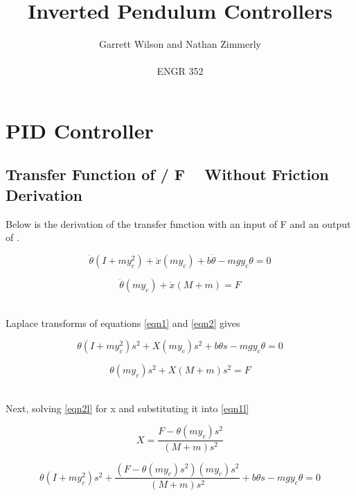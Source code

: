 \documentclass{article}
\begin{document}
\title{Inverted Pendulum Controllers}
\author{Garrett Wilson and Nathan Zimmerly \\ \\
ENGR 352}
\maketitle

\clearpage

\tableofcontents

\pagebreak

\section{PID Controller}
\subsection{Transfer Function of \theta / F \ \textrm{ Without Friction Derivation}}
Below is the derivation of the transfer function with an input of F and an output of \theta.


\begin{equation} 
\label{eqn1}
\ddot \theta (I+m y_c^2)+\ddot x (m y_c)+b \dot \theta - m g y_c \theta = 0 
\end{equation}


\begin{equation} 
\label{eqn2}
\ddot \theta(m y_c) + \ddot x(M+m) = F
\end{equation}

\\
Laplace transforms of equations \ref{eqn1} and \ref{eqn2} gives


\begin{equation} 
\label{eqn1l}
\theta (I+m y_c^2) s^2+ X (m y_c) s^2+b \theta s - m g y_c \theta = 0 
\end{equation}


\begin{equation}  
\label{eqn2l}
\theta (m y_c) s^2+ X (M+m) s^2= F
\end{equation}

\\
Next, solving \ref{eqn2l} for x and substituting it into \ref{eqn1l}

\begin{equation}  
\label{eqn2lb}
X = \frac{F - \theta (m y_c) s^2}{(M+m) s^2}
\end{equation}

\begin{equation} 
\label{eqn3}
\theta (I+m y_c^2) s^2+ \frac{(F - \theta (m y_c) s^2)(m y_c) s^2}{(M+m) s^2} + b \theta s - m g y_c \theta = 0 
\end{equation}
\end{document}
